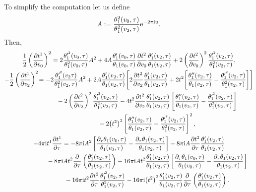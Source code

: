 \documentclass[pdftex]{sigma}%
\numberwithin{equation}{section}
\begin{document}
To simplify the computation let us define
\begin{gather*}
A:=\frac{\theta_1^2(v_0,\tau)}{\theta_1^2(v_2,\tau)}{\rm e}^{-2\pi {\rm i} u}.
\end{gather*}
Then,
\begin{gather*}
\frac{1}{2}\left(\frac{\partial t^1}{\partial v_0}\right)^2 =2\frac{\theta_1^{\prime^2}(v_0,\tau)}{\theta_1^2(v_0,\tau)}A^2 +4A\frac{\theta_1^{\prime}(v_0,\tau)}{\theta_1(v_0,\tau)}
\frac{\partial t^2}{\partial v_0}\frac{\theta_1^{\prime}(v_2,\tau)}{\theta_1(v_2,\tau)} +2\left(\frac{\partial t^2}{\partial v_0}\right)^2\frac{\theta_1^{\prime^2}(v_2,\tau)}{\theta_1^2(v_2,\tau)},
\\
-\frac{1}{2}\left(\frac{\partial t^1}{\partial v_2}\right)^2\! =-2\frac{\theta_1^{\prime^2}(v_2\tau)}{\theta_1^2(v_2,\tau)}A^2
+2A\frac{\theta_1^{\prime}(v_2,\tau)}{\theta_1(v_2,\tau)}\! \left[2\frac{\partial t^2}{\partial v_2}\frac{\theta_1^{\prime}(v_2,\tau)}{\theta_1(v_2,\tau)} +2t^2\!\left[\frac{\theta_1^{\prime\prime}(v_2,\tau)}{\theta_1(v_2,\tau)} -\frac{\theta_1^{\prime^2}(v_2,\tau)}{\theta_1^2(v_2,\tau)}\right]\right]
\\ \hphantom{\frac{1}{2}\left(\frac{\partial t^1}{\partial v_0}\right)^2 =}
-2\left(\frac{\partial t^2}{\partial v_2}\right)^2 \frac{\theta_1^{\prime^2}(v_2,\tau)}{\theta_1^2(v_2,\tau)} -4t^2\frac{\partial t^2}{\partial v_2}\frac{\theta_1^{\prime}(v_2,\tau)}{\theta_1(v_2,\tau)} \left[\frac{\theta_1^{\prime\prime}(v_2,\tau)}{\theta_1(v_2,\tau)} -\frac{\theta_1^{\prime^2}(v_2,\tau)}{\theta_1^2(v_2,\tau)}\right]
\\ \hphantom{\frac{1}{2}\left(\frac{\partial t^1}{\partial v_0}\right)^2 =}
-2\big(t^2\big)^2\left[\frac{\theta_1^{\prime\prime}(v_2,\tau)}{\theta_1(v_2,\tau)} -\frac{\theta_1^{\prime^2}(v_2,\tau)}{\theta_1^2(v_2,\tau)}\right]^2,
\\
-4\pi {\rm i}t^1\frac{\partial t^1}{\partial \tau}=-8\pi {\rm i}A^2\left[\frac{\partial_{\tau}\theta_1(v_0,\tau)}{\theta_1(v_0,\tau)} -\frac{\partial_{\tau}\theta_1(v_2,\tau)}{\theta_1(v_2,\tau)}\right]
-8\pi {\rm i}A\frac{\partial t^2}{\partial \tau}\frac{\theta_1^{\prime}(v_2,\tau)}{\theta_1(v_2,\tau)}
\\ \hphantom{-4\pi {\rm i}t^1\frac{\partial t^1}{\partial \tau}=}
{}-8\pi {\rm i}At^2\frac{\partial}{\partial \tau}\left(\frac{\theta_1^{\prime}(v_2,\tau)}{\theta_1(v_2,\tau)}\right)-16\pi {\rm i}A t^2\frac{\theta_1^{\prime}(v_2,\tau)}{\theta_1(v_2,\tau)} \left[\frac{\partial_{\tau}\theta_1(v_0,\tau)}{\theta_1(v_0,\tau)} {}-\frac{\partial_{\tau}\theta_1(v_2,\tau)}{\theta_1(v_2,\tau)}\right]
\\ \hphantom{-4\pi {\rm i}t^1\frac{\partial t^1}{\partial \tau}=}
-16\pi {\rm i}t^2\frac{\partial t^2}{\partial \tau}\frac{\theta_1^{\prime^2}(v_2,\tau)}{\theta_1^2(v_2,\tau)}-16\pi {\rm i}\big(t^2\big)^2\frac{\theta_1^{\prime}(v_2,\tau)}{\theta_1(v_2,\tau)}\frac{\partial}{\partial \tau}\left(\frac{\theta_1^{\prime}(v_2,\tau)}{\theta_1(v_2,\tau)}\right).
\end{gather*}
\end{document}
